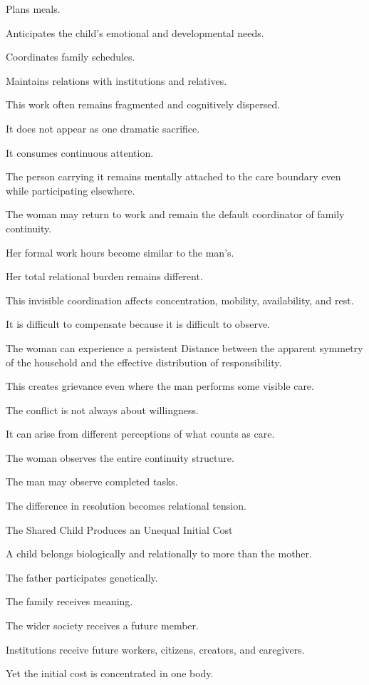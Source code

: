 Plans meals.

Anticipates the child’s emotional and developmental needs.

Coordinates family schedules.

Maintains relations with institutions and relatives.

This work often remains fragmented and cognitively dispersed.

It does not appear as one dramatic sacrifice.

It consumes continuous attention.

The person carrying it remains mentally attached to the care boundary even while participating elsewhere.

The woman may return to work and remain the default coordinator of family continuity.

Her formal work hours become similar to the man’s.

Her total relational burden remains different.

This invisible coordination affects concentration, mobility, availability, and rest.

It is difficult to compensate because it is difficult to observe.

The woman can experience a persistent Distance between the apparent symmetry of the household and the effective distribution of responsibility.

This creates grievance even where the man performs some visible care.

The conflict is not always about willingness.

It can arise from different perceptions of what counts as care.

The woman observes the entire continuity structure.

The man may observe completed tasks.

The difference in resolution becomes relational tension.

The Shared Child Produces an Unequal Initial Cost

A child belongs biologically and relationally to more than the mother.

The father participates genetically.

The family receives meaning.

The wider society receives a future member.

Institutions receive future workers, citizens, creators, and caregivers.

Yet the initial cost is concentrated in one body.

